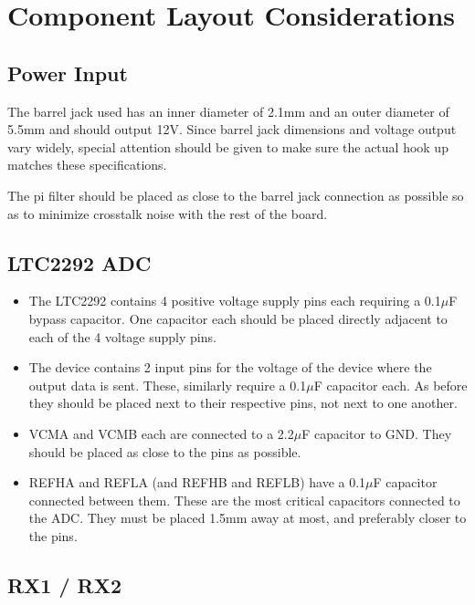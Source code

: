 \documentclass{default}
\begin{document}
\section{Component Layout Considerations}

\subsection{Power Input}
\label{sec:power-input-layout}

The barrel jack used has an inner diameter of 2.1mm and an outer diameter of 5.5mm and should output
12V. Since barrel jack dimensions and voltage output vary widely, special attention should be given
to make sure the actual hook up matches these specifications.

The pi filter should be placed as close to the barrel jack connection as possible so as to minimize
crosstalk noise with the rest of the board.

\subsection{LTC2292 ADC}

\begin{itemize}
\item The LTC2292 contains 4 positive voltage supply pins each requiring a 0.1$\mu$F bypass
        capacitor. One capacitor each should be placed directly adjacent to each of the 4 voltage supply
        pins.
\item The device contains 2 input pins for the voltage of the device where the output data
        is sent. These, similarly require a 0.1$\mu$F capacitor each. As before they should be placed next
        to their respective pins, not next to one another.
\item VCMA and VCMB each are connected to a 2.2$\mu$F capacitor to GND. They should be placed
        as close to the pins as possible.
\item REFHA and REFLA (and REFHB and REFLB) have a 0.1$\mu$F capacitor connected between
        them. These are the most critical capacitors connected to the ADC. They must be placed 1.5mm away
        at most, and preferably closer to the pins.
\end{itemize}

\subsection{RX1 / RX2}
\end{document}
